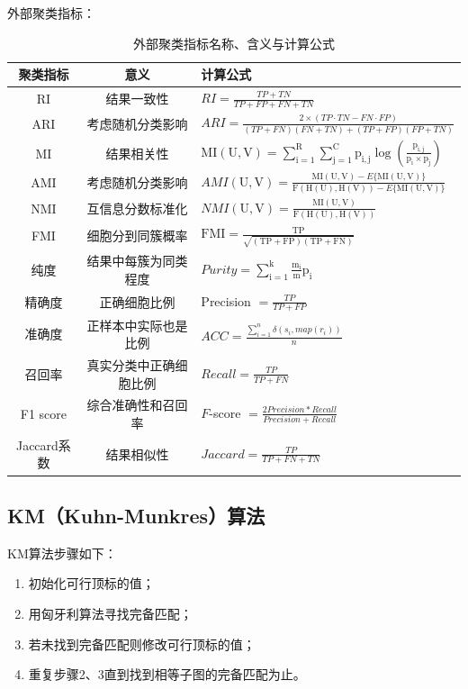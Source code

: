 \documentclass {article}
\begin{document}
	外部聚类指标：
	\begin{table}[H]
		\centering
		\caption{外部聚类指标名称、含义与计算公式}
		\begin{tabular}{ccl}
			\hline
			聚类指标 & 意义 & 计算公式 \\
			\hline
			RI & 结果一致性 & $R I=\frac{T P+T N}{T P+F P+F N+T N}$ \\
			ARI & 考虑随机分类影响 & $A R I=\frac{2 \times(T P \cdot T N-F N \cdot F P)}{(T P+F N)(F N+T N)+(T P+F P)(F P+T N)}$ \\
			MI & 结果相关性 & $\mathrm{MI}(\mathrm{U}, \mathrm{V})=\sum_{\mathrm{i}=1}^{\mathrm{R}} \sum_{\mathrm{j}=1}^{\mathrm{C}} \mathrm{p}_{\mathrm{i}, \mathrm{j}} \log \left(\frac{\mathrm{p}_{\mathrm{i}, \mathrm{j}}}{\mathrm{p}_{\mathrm{i}} \times \mathrm{p}_{\mathrm{j}}}\right)$ \\
			AMI & 考虑随机分类影响 & ${AMI}(\mathrm{U}, \mathrm{V})=\frac{\mathrm{MI}(\mathrm{U}, \mathrm{V})-{E}\{\mathrm{MI}(\mathrm{U}, \mathrm{V})\}}{\mathrm{F}(\mathrm{H}(\mathrm{U}), \mathrm{H}(\mathrm{V}))-{E}\{\mathrm{MI}(\mathrm{U}, \mathrm{V})\}}$ \\
			NMI & 互信息分数标准化 & ${NMI}(\mathrm{U}, \mathrm{V})=\frac{\mathrm{MI}(\mathrm{U}, \mathrm{V})}{\mathrm{F}(\mathrm{H}(\mathrm{U}), \mathrm{H}(\mathrm{V}))}$ \\
			FMI & 细胞分到同簇概率 & $\mathrm{FMI}=\frac{\mathrm{TP}}{\sqrt{(\mathrm{TP}+\mathrm{FP})(\mathrm{TP}+\mathrm{FN})}}$ \\
			纯度 & 结果中每簇为同类程度 & $Purity=\sum_{\mathrm{i}=1}^{\mathrm{k}} \frac{\mathrm{m}_{\mathrm{i}}}{\mathrm{m}} \mathrm{p}_{\mathrm{i}}$ \\
			精确度 & 正确细胞比例 & Precision $=\frac{T P}{T P+F P}$ \\
			准确度 & 正样本中实际也是比例 & $ACC=\frac{\sum_{i=1}^n \delta\left(s_i, {map}\left(r_i\right)\right)}{n}$ \\
			召回率 & 真实分类中正确细胞比例 & $Recall=\frac{T P}{T P+F N}$ \\
			F1 score & 综合准确性和召回率 & $F$-score $=\frac{2 { Precision } * { Recall }}{{ Precision }+ { Recall }}$ \\
			Jaccard系数 & 结果相似性 & $Jaccard=\frac{T P}{T P+F N+T N}$ \\
			\hline 	                                                                                         
		\end{tabular}
	\end{table}
	
	\subsection{KM（Kuhn-Munkres）算法}
	\label{KM算法原理}
	KM算法步骤如下：
	\begin{enumerate}
		\item 初始化可行顶标的值；
		\item 用匈牙利算法寻找完备匹配；
		\item 若未找到完备匹配则修改可行顶标的值；
		\item 重复步骤2、3直到找到相等子图的完备匹配为止。
	\end{enumerate}
	
\end{document}
